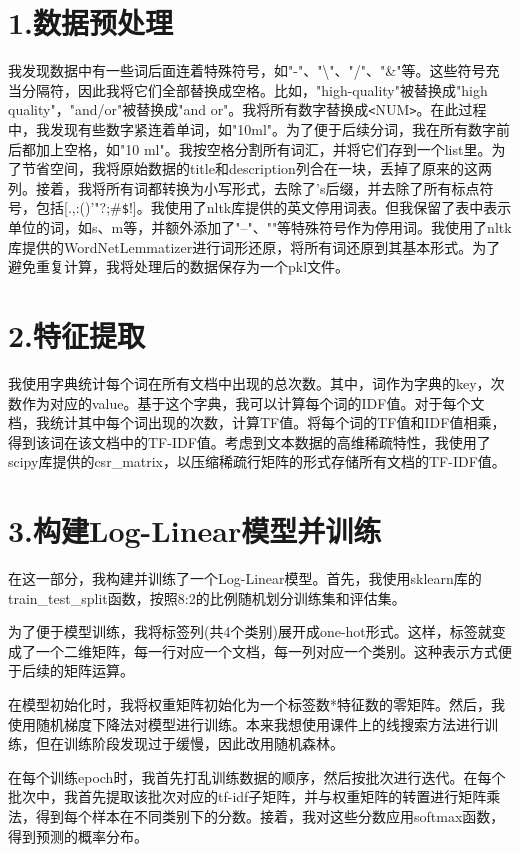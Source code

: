 \documentclass[12pt,letterpaper]{article}
\begin{document}
\section*{1.数据预处理}
  我发现数据中有一些词后面连着特殊符号，如"-"、"\textbackslash"、"/"、"\&"等。这些符号充当分隔符，因此我将它们全部替换成空格。比如，"high-quality"被替换成"high quality"，"and/or"被替换成"and or"。我将所有数字替换成\verb|<|NUM\verb|>|。在此过程中，我发现有些数字紧连着单词，如"10ml"。为了便于后续分词，我在所有数字前后都加上空格，如"10 ml"。我按空格分割所有词汇，并将它们存到一个list里。为了节省空间，我将原始数据的title和description列合在一块，丢掉了原来的这两列。接着，我将所有词都转换为小写形式，去除了's后缀，并去除了所有标点符号，包括[.,:()'"?;\#\verb|$|!]。我使用了nltk库提供的英文停用词表。但我保留了表中表示单位的词，如s、m等，并额外添加了"--"、""等特殊符号作为停用词。我使用了nltk库提供的WordNetLemmatizer进行词形还原，将所有词还原到其基本形式。为了避免重复计算，我将处理后的数据保存为一个pkl文件。

\section*{2.特征提取}

我使用字典统计每个词在所有文档中出现的总次数。其中，词作为字典的key，次数作为对应的value。基于这个字典，我可以计算每个词的IDF值。对于每个文档，我统计其中每个词出现的次数，计算TF值。将每个词的TF值和IDF值相乘，得到该词在该文档中的TF-IDF值。考虑到文本数据的高维稀疏特性，我使用了scipy库提供的csr\_matrix，以压缩稀疏行矩阵的形式存储所有文档的TF-IDF值。

\section*{3.构建Log-Linear模型并训练}
在这一部分，我构建并训练了一个Log-Linear模型。首先，我使用sklearn库的train\_test\_split函数，按照8:2的比例随机划分训练集和评估集。

为了便于模型训练，我将标签列(共4个类别)展开成one-hot形式。这样，标签就变成了一个二维矩阵，每一行对应一个文档，每一列对应一个类别。这种表示方式便于后续的矩阵运算。

在模型初始化时，我将权重矩阵初始化为一个标签数*特征数的零矩阵。然后，我使用随机梯度下降法对模型进行训练。本来我想使用课件上的线搜索方法进行训练，但在训练阶段发现过于缓慢，因此改用随机森林。

在每个训练epoch时，我首先打乱训练数据的顺序，然后按批次进行迭代。在每个批次中，我首先提取该批次对应的tf-idf子矩阵，并与权重矩阵的转置进行矩阵乘法，得到每个样本在不同类别下的分数。接着，我对这些分数应用softmax函数，得到预测的概率分布。
\end{document}
